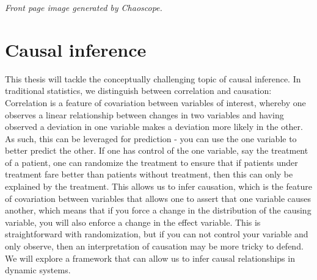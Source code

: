 \documentclass[11pt, a4paper]{memoir}
\subtitle{Convergent Cross Mapping and Alternative Approaches}
\begin{document}
\begingroup
  \selectfont
  \maketitle
  \textit{Front page image generated by Chaoscope.}
\endgroup

\tableofcontents

\section{Causal inference}
This thesis will tackle the conceptually challenging topic of causal inference. In traditional statistics, we distinguish between correlation and causation: Correlation is a feature of covariation between variables of interest, whereby one observes a linear relationship between changes in two variables and having observed a deviation in one variable makes a deviation more likely in the other. As such, this can be leveraged for prediction - you can use the one variable to better predict the other. If one has control of the one variable, say the treatment of a patient, one can randomize the treatment to ensure that if patients under treatment fare better than patients without treatment, then this can only be explained by the treatment. This allows us to infer causation, which is the feature of covariation between variables that allows one to assert that one variable causes another, which means that if you force a change in the distribution of the causing variable, you will also enforce a change in the effect variable. This is straightforward with randomization, but if you can not control your variable and only observe, then an interpretation of causation may be more tricky to defend. We will explore a framework that can allow us to infer causal relationships in dynamic systems.
\end{document}
